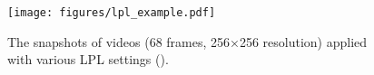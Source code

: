 \begin{figure}[!htb]
    \centering
    \texttt{[image: figures/lpl\_example.pdf]}     
    \caption{The snapshots of videos (68 frames, 256×256 resolution) applied with various LPL settings ().}
    \label{fig:lpl-end-to-end-generated-frames1}
\end{figure}

